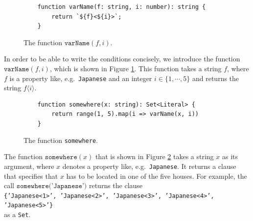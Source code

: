 \begin{figure}[!ht]
\centering
\begin{verbatim}
    function varName(f: string, i: number): string {
        return `${f}<${i}>`;
    }
\end{verbatim}
\vspace*{-0.3cm}
\caption{The function $\texttt{varName}(f, i)$.}
\label{fig:var_f_i}
\end{figure}

In order to be able to write the conditions concisely, we introduce the function
$\texttt{varName}(f, i)$, which is shown in Figure \ref{fig:var_f_i}.  This function
takes a string $f$, where $f$ is a property like, e.g.~\texttt{Japanese} and an
integer $i \in \{1,\cdots,5\}$ and returns the string $f\langle i\rangle$.




\begin{figure}[!ht]
\centering
\begin{verbatim}
    function somewhere(x: string): Set<Literal> {
        return range(1, 5).map(i => varName(x, i))
    }
\end{verbatim}
\vspace*{-0.3cm}
\caption{The function \texttt{somewhere}.}
\label{fig:somewhere}
\end{figure}
The function $\texttt{somewhere}(x)$ that is shown in Figure \ref{fig:somewhere}
takes a string $x$ as its argument, where $x$ denotes a property like,
e.g.~\texttt{Japanese}.  It returns a clause that specifies that $x$ has to be
located in one of the five houses.  For example,  the call
$\texttt{somewhere('Japanese')}$ returns the clause
\\[0.2cm]
\hspace*{1.3cm}
\texttt{\{'Japanese<1>', 'Japanese<2>', 'Japanese<3>', 'Japanese<4>', 'Japanese<5>'\}}
\\[0.2cm]
as a \texttt{Set}.

